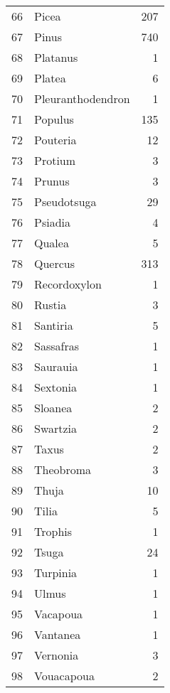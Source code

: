 \documentclass[]{article}
\begin{document}
\begin{table}[ht]
\begin{tabular}{rlr}
  66 & Picea & 207 \\ 
  67 & Pinus & 740 \\ 
  68 & Platanus &   1 \\ 
  69 & Platea &   6 \\ 
  70 & Pleuranthodendron &   1 \\ 
  71 & Populus & 135 \\ 
  72 & Pouteria &  12 \\ 
  73 & Protium &   3 \\ 
  74 & Prunus &   3 \\ 
  75 & Pseudotsuga &  29 \\ 
  76 & Psiadia &   4 \\ 
  77 & Qualea &   5 \\ 
  78 & Quercus & 313 \\ 
  79 & Recordoxylon &   1 \\ 
  80 & Rustia &   3 \\ 
  81 & Santiria &   5 \\ 
  82 & Sassafras &   1 \\ 
  83 & Saurauia &   1 \\ 
  84 & Sextonia &   1 \\ 
  85 & Sloanea &   2 \\ 
  86 & Swartzia &   2 \\ 
  87 & Taxus &   2 \\ 
  88 & Theobroma &   3 \\ 
  89 & Thuja &  10 \\ 
  90 & Tilia &   5 \\ 
  91 & Trophis &   1 \\ 
  92 & Tsuga &  24 \\ 
  93 & Turpinia &   1 \\ 
  94 & Ulmus &   1 \\ 
  95 & Vacapoua &   1 \\ 
  96 & Vantanea &   1 \\ 
  97 & Vernonia &   3 \\ 
  98 & Vouacapoua &   2 \\ 
   \hline
\end{tabular}
\end{table}
\end{document}
